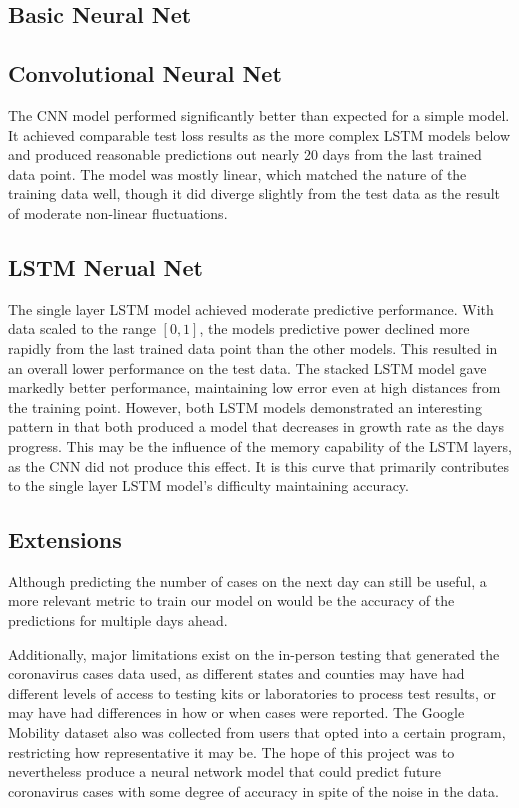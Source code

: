 ﻿\documentclass{article}
\begin{document}
  \begin{multicols}{2}
    
\subsection*{Basic Neural Net}

\subsection*{Convolutional Neural Net}

The CNN model performed significantly better than expected for a simple model.
It achieved comparable test loss results as the more complex LSTM models below
and produced reasonable predictions out nearly 20 days from the last trained
data point. The model was mostly linear, which matched the nature of the
training data well, though it did diverge slightly from the test data as the
result of moderate non-linear fluctuations.

\subsection*{LSTM Nerual Net}

The single layer LSTM model achieved moderate predictive performance.
With data scaled to the range $[0, 1]$, the models predictive power declined
more rapidly from the last trained data point than the other models.
This resulted in an overall lower performance on the test data.
The stacked LSTM model gave markedly better performance,
maintaining low error even at high distances from the training point.
However, both LSTM models demonstrated an interesting pattern in that both
produced a model that decreases in growth rate as the days progress.
This may be the influence of the memory capability of the LSTM layers,
as the CNN did not produce this effect. It is this curve that primarily
contributes to the single layer LSTM model's difficulty maintaining accuracy.

\subsection*{Extensions}

Although predicting the number of cases on the next day can still be useful, a
more relevant metric to train our model on would be the accuracy of the
predictions for multiple days ahead.

Additionally, major limitations exist on the in-person testing that generated
the coronavirus cases data used, as different states and counties may have had
different levels of access to testing kits or laboratories to process test
results, or may have had differences in how or when cases were reported. The
Google Mobility dataset also was collected from users that opted into a certain
program, restricting how representative it may be. The hope of this project was
to nevertheless produce a neural network model that could predict future
coronavirus cases with some degree of accuracy in spite of the noise in the
data.



\end{multicols}
\end{document}
